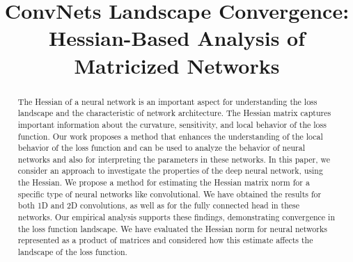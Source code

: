 \documentclass[conference]{IEEEtran}
\begin{document}
\title{ConvNets Landscape Convergence: Hessian-Based Analysis of Matricized Networks}





\maketitle
\newcommand{\f}[1]{f_{\btheta}(#1)}
\begin{abstract}
The Hessian of a neural network is an important aspect for understanding the loss landscape and the characteristic of network architecture. The Hessian matrix captures important information about the curvature, sensitivity, and local behavior of the loss function. Our work proposes a method that enhances the understanding of the local behavior of the loss function and can be used to analyze the behavior of neural networks and also for interpreting the parameters in these networks. In this paper, we consider an approach to investigate the properties of the deep neural network, using the Hessian. We propose a method for estimating the Hessian matrix norm for a specific type of neural networks like convolutional. We have obtained the results for both 1D and 2D convolutions, as well as for the fully connected head in these networks. Our empirical analysis supports these findings, demonstrating convergence in the loss function landscape. We have evaluated the Hessian norm for neural networks represented as a product of matrices and considered how this estimate affects the landscape of the loss function.
\end{abstract}
\end{document}
